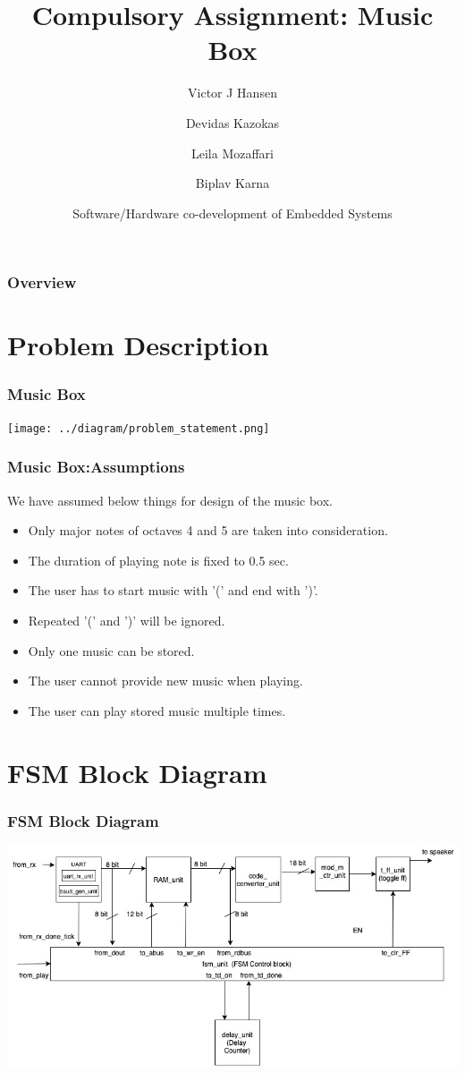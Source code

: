 \documentclass{beamer}
\title{Compulsory Assignment: Music Box}
\author[Victor,Devidas,Leila,Biplav]{Victor J Hansen\inst{1}
\and Devidas Kazokas\inst{2} \break
\and Leila Mozaffari\inst{3}
\and Biplav Karna\inst{4}
}
\institute{USN Kongsberg}
\date[ES-SHC4300,Feb 2020]{ Software/Hardware co-development of Embedded Systems }
\begin{document}
 
\frame{\titlepage}
 
\begin{frame}
\frametitle{Overview}
\tableofcontents
\end{frame}

\section{Problem Description}
\begin{frame}
\frametitle{Music Box}
\texttt{[image: ../diagram/problem\_statement.png]}
\end{frame}
 
\begin{frame}
\frametitle{Music Box:Assumptions}
We have assumed below things for design of the music box.
\begin{itemize}
\item Only major notes of octaves 4 and 5 are taken into consideration.
\item The duration of playing note is fixed to 0.5 sec.
\item The user has to start music with '(' and end with ')'.
\item Repeated '(' and ')' will be ignored.
\item Only one music can be stored.
\item The user cannot provide new music when playing.
\item The user can play stored music multiple times.
\end {itemize}
\end{frame}

\section{FSM Block Diagram}
\begin{frame}
\frametitle{FSM Block Diagram}
\includegraphics[width=\textwidth,height=0.8\textheight] {../diagram/ccw_music_player-fsm_block_diagram.jpg}
\end{frame}
 
\end{document}
